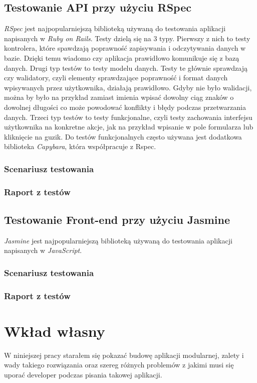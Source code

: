 \documentclass[brudnopis]{xmgr}
\begin{document}
\section{Testowanie API przy użyciu RSpec}
\textit{RSpec} jest najpopularniejszą biblioteką używaną do testowania aplikacji napisanych w \textit{Ruby on Rails}. Testy dzielą się na 3 typy. Pierwszy z nich to testy kontrolera, które spawdzają poprawność zapisywania i odczytywania danych w bazie. Dzięki temu wiadomo czy aplikacja prawidłowo komunikuje się z bazą danych. Drugi typ testów to testy modelu danych. Testy te głównie sprawdzają czy walidatory, czyli elementy sprawdzające poprawność i format danych wpisywanych przez użytkownika, działają prawidłowo. Gdyby nie było walidacji, można by było na przykład zamiast imienia wpisać dowolny ciąg znaków o dowolnej długości co może powodować konflikty i błędy podczas przetwarzania danych. Trzeci typ testów to testy funkcjonalne, czyli testy zachowania interfejsu użytkownika na konkretne akcje, jak na przykład wpisanie w pole formularza lub kliknięcie na guzik. Do testów funkcjonalnych często używana jest dodatkowa biblioteka \textit{Capybara}, która współpracuje z Rspec. 
\subsection{Scenariusz testowania}
\subsection{Raport z testów}
\section{Testowanie Front-end przy użyciu Jasmine}
\textit{Jasmine} jest najpopularniejszą biblioteką używaną do testowania aplikacji napisanych w \textit{JavaScript}. 
\subsection{Scenariusz testowania}
\subsection{Raport z testów}
\chapter{Wkład własny}
\summary
W niniejszej pracy starałem się pokazać budowę aplikacji modularnej, zalety i wady takiego rozwiązania oraz szereg różnych problemów z jakimi musi się uporać developer podczas pisania takowej aplikacji. 
\appendix
\end{document}
